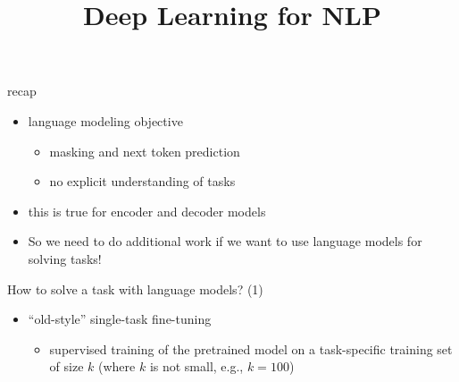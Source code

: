 \documentclass[11pt,compress,t,notes=noshow, xcolor=table]{beamer}
\title{Deep Learning for NLP}
\begin{document}




\begin{frame}{recap}

\vfill

\begin{itemize}
    \item language modeling objective
        \begin{itemize}
            \item masking and next token prediction
            \item no explicit understanding of tasks
        \end{itemize}
    \item this is true for encoder and decoder models
    \item So we need to do additional work if we want
        to use language models for solving tasks!
\end{itemize}

\vfill

\end{frame}


\begin{frame}{How to solve a task with language models? (1)}

\vfill

\begin{itemize}
    \item ``old-style'' single-task fine-tuning 
        \begin{itemize}
            \item supervised training
of the pretrained model
on a task-specific
        training set of size $k$ (where $k$ is not small,
        e.g., $k=100$)
        \end{itemize}
\end{itemize}

\vfill

\end{frame}
\end{document}
